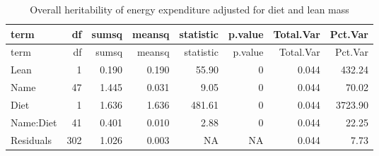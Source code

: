 \documentclass[]{article}
\newenvironment{Shaded}{\begin{snugshade}}{\end{snugshade}}
\newcommand{\DataTypeTok}[1]{\textcolor[rgb]{0.13,0.29,0.53}{#1}}
\newcommand{\DecValTok}[1]{\textcolor[rgb]{0.00,0.00,0.81}{#1}}
\newcommand{\KeywordTok}[1]{\textcolor[rgb]{0.13,0.29,0.53}{\textbf{#1}}}
\newcommand{\NormalTok}[1]{#1}
\newcommand{\OperatorTok}[1]{\textcolor[rgb]{0.81,0.36,0.00}{\textbf{#1}}}
\newcommand{\StringTok}[1]{\textcolor[rgb]{0.31,0.60,0.02}{#1}}
\begin{document}
\begin{Shaded}
\end{Shaded}

\begin{longtable}[]{@{}lrrrrrrr@{}}
\caption{Overall heritability of energy expenditure adjusted for diet
and lean mass}\tabularnewline
\toprule
term & df & sumsq & meansq & statistic & p.value & Total.Var &
Pct.Var\tabularnewline
\midrule
\endfirsthead
\toprule
term & df & sumsq & meansq & statistic & p.value & Total.Var &
Pct.Var\tabularnewline
\midrule
\endhead
Lean & 1 & 0.190 & 0.190 & 55.90 & 0 & 0.044 & 432.24\tabularnewline
Name & 47 & 1.445 & 0.031 & 9.05 & 0 & 0.044 & 70.02\tabularnewline
Diet & 1 & 1.636 & 1.636 & 481.61 & 0 & 0.044 & 3723.90\tabularnewline
Name:Diet & 41 & 0.401 & 0.010 & 2.88 & 0 & 0.044 & 22.25\tabularnewline
Residuals & 302 & 1.026 & 0.003 & NA & NA & 0.044 & 7.73\tabularnewline
\bottomrule
\end{longtable}
\end{document}
